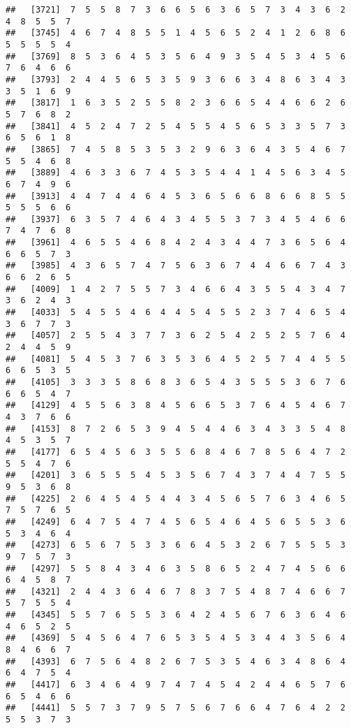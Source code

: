 \documentclass[
]{book}
\begin{document}
\begin{verbatim}
##   [3721]  7  5  5  8  7  3  6  6  5  6  3  6  5  7  3  4  3  6  2  4  8  5  5  7
##   [3745]  4  6  7  4  8  5  5  1  4  5  6  5  2  4  1  2  6  8  6  5  5  5  5  4
##   [3769]  8  5  3  6  4  5  3  5  6  4  9  3  5  4  5  3  4  5  6  7  6  4  6  6
##   [3793]  2  4  4  5  6  5  3  5  9  3  6  6  3  4  8  6  3  4  3  3  5  1  6  9
##   [3817]  1  6  3  5  2  5  5  8  2  3  6  6  5  4  4  6  6  2  6  5  7  6  8  2
##   [3841]  4  5  2  4  7  2  5  4  5  5  4  5  6  5  3  3  5  7  3  6  5  6  1  8
##   [3865]  7  4  5  8  5  3  5  3  2  9  6  3  6  4  3  5  4  6  7  5  5  4  6  8
##   [3889]  4  6  3  3  6  7  4  5  3  5  4  4  1  4  5  6  3  4  5  6  7  4  9  6
##   [3913]  4  4  7  4  4  6  4  5  3  6  5  6  6  8  6  6  8  5  5  5  5  5  6  6
##   [3937]  6  3  5  7  4  6  4  3  4  5  5  3  7  3  4  5  4  6  6  7  4  7  6  8
##   [3961]  4  6  5  5  4  6  8  4  2  4  3  4  4  7  3  6  5  6  4  6  6  5  7  3
##   [3985]  4  3  6  5  7  4  7  5  6  3  6  7  4  4  6  6  7  4  3  6  6  2  6  5
##   [4009]  1  4  2  7  5  5  7  3  4  6  6  4  3  5  5  4  3  4  7  3  6  2  4  3
##   [4033]  5  4  5  5  4  6  4  4  5  4  5  5  2  3  7  4  6  5  4  3  6  7  7  3
##   [4057]  2  5  5  4  3  7  7  3  6  2  5  4  2  5  2  5  7  6  4  2  4  4  5  9
##   [4081]  5  4  5  3  7  6  3  5  3  6  4  5  2  5  7  4  4  5  5  6  6  5  3  5
##   [4105]  3  3  3  5  8  6  8  3  6  5  4  3  5  5  5  3  6  7  6  6  6  5  4  7
##   [4129]  4  5  5  6  3  8  4  5  6  6  5  3  7  6  4  5  4  6  7  4  3  7  6  6
##   [4153]  8  7  2  6  5  3  9  4  5  4  4  6  3  4  3  3  5  4  8  4  5  3  5  7
##   [4177]  6  5  4  5  6  3  5  5  6  8  4  6  7  8  5  6  4  7  2  5  5  4  7  6
##   [4201]  3  6  5  5  5  4  5  3  5  6  7  4  3  7  4  4  7  5  5  9  5  3  6  8
##   [4225]  2  6  4  5  4  5  4  4  3  4  5  6  5  7  6  3  4  6  5  7  5  7  6  5
##   [4249]  6  4  7  5  4  7  4  5  6  5  4  6  4  5  6  5  5  3  6  5  3  4  6  4
##   [4273]  6  5  6  7  5  3  3  6  6  4  5  3  2  6  7  5  5  5  3  9  7  5  7  3
##   [4297]  5  5  8  4  3  4  6  3  5  8  6  5  2  4  7  4  5  6  6  6  4  5  8  7
##   [4321]  2  4  4  3  6  4  6  7  8  3  7  5  4  8  7  4  6  6  7  5  7  5  5  4
##   [4345]  5  5  7  6  5  5  3  6  4  2  4  5  6  7  6  3  6  4  6  4  6  5  2  5
##   [4369]  5  4  5  6  4  7  6  5  3  5  4  5  3  4  4  3  5  6  4  8  4  6  6  7
##   [4393]  6  7  5  6  4  8  2  6  7  5  3  5  4  6  3  4  8  6  4  6  4  7  5  4
##   [4417]  6  3  4  6  4  9  7  4  7  4  5  4  2  4  4  6  5  7  6  6  5  4  6  6
##   [4441]  5  5  7  3  7  9  5  7  5  6  7  6  6  4  7  6  4  2  2  5  5  3  7  3

\end{verbatim}
\end{document}
